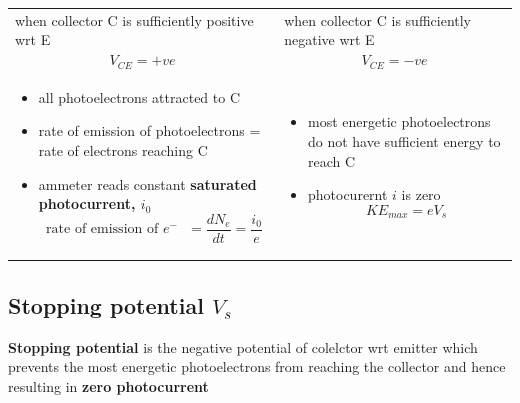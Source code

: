 \documentclass[a4paper, 10pt]{article}
\begin{document}
\begin{center}
   \begin{tabular}{T | T}
      when collector C is sufficiently positive wrt E & when collector C is sufficiently negative wrt E \\
      \[
         V_{CE} = +ve 
      \] &
      \[
         V_{CE} = -ve
      \] \\
      \begin{itemize}
         \item all photoelectrons attracted to C
         \item rate of emission of photoelectrons = rate of electrons reaching C
         \item ammeter reads constant \textbf{saturated photocurrent, $i_0$ }
            \[
               \text{rate of emission of $e^-$ } = \frac{dN_e}{dt} = \frac{i_0}{e}
            \]
      \end{itemize}	  &
      \begin{itemize}
         \item most energetic photoelectrons do not have sufficient energy to reach C
         \item photocurernt $i$ is zero
            \[
               KE_{max} = eV_s
            \]
      \end{itemize}	
   \end{tabular}
\end{center}

\subsection{Stopping potential $V_s$ }
\begin{framed}
   \textbf{Stopping potential} is the negative potential of colelctor wrt emitter which prevents the most energetic photoelectrons from reaching the collector and hence resulting in \textbf{zero photocurrent}
\end{framed}	
\end{document}

